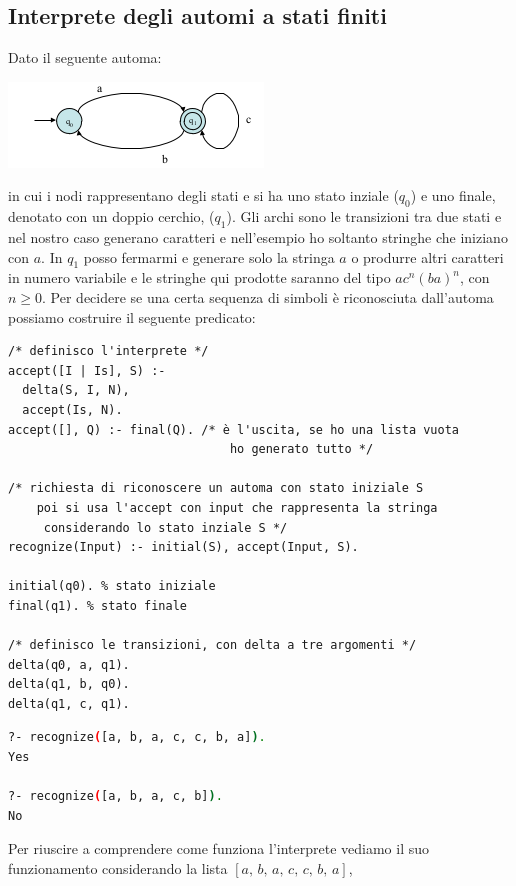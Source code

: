 \documentclass[a4paper]{book}
\begin{document}
\subsection{Interprete degli automi a stati finiti}
Dato il seguente automa:
\begin{center}
\includegraphics[scale=0.8]{img/aut.png}
\end{center}
in cui i nodi rappresentano degli stati e si ha uno stato inziale ($q_0$) e uno finale, denotato con un doppio cerchio, ($q_1$).\newline
Gli archi sono le transizioni tra due stati e nel nostro caso generano caratteri e nell'esempio ho soltanto stringhe che iniziano con $a$.\newline
In $q_1$ posso fermarmi e generare solo la stringa $a$ o produrre altri caratteri in numero variabile e le stringhe qui prodotte
saranno del tipo $ac^n(ba)^n$, con $n\geq 0$.\newline
Per decidere se una certa sequenza di simboli è riconosciuta dall’automa possiamo costruire il seguente predicato:
\begin{verbatim}
/* definisco l'interprete */
accept([I | Is], S) :-
  delta(S, I, N),
  accept(Is, N).
accept([], Q) :- final(Q). /* è l'uscita, se ho una lista vuota
                               ho generato tutto */

/* richiesta di riconoscere un automa con stato iniziale S
    poi si usa l'accept con input che rappresenta la stringa
     considerando lo stato inziale S */
recognize(Input) :- initial(S), accept(Input, S).

initial(q0). % stato iniziale
final(q1). % stato finale

/* definisco le transizioni, con delta a tre argomenti */
delta(q0, a, q1).
delta(q1, b, q0).
delta(q1, c, q1).
\end{verbatim}
\begin{shaded}
\begin{lstlisting}[language=bash]
?- recognize([a, b, a, c, c, b, a]).
Yes

?- recognize([a, b, a, c, b]).
No
\end{lstlisting}
\end{shaded}
Per riuscire a comprendere come funziona l'interprete vediamo il suo funzionamento considerando la lista $[a,\,b,\,a,\,c,\,c,\,b,\,a]$,
\end{document}
